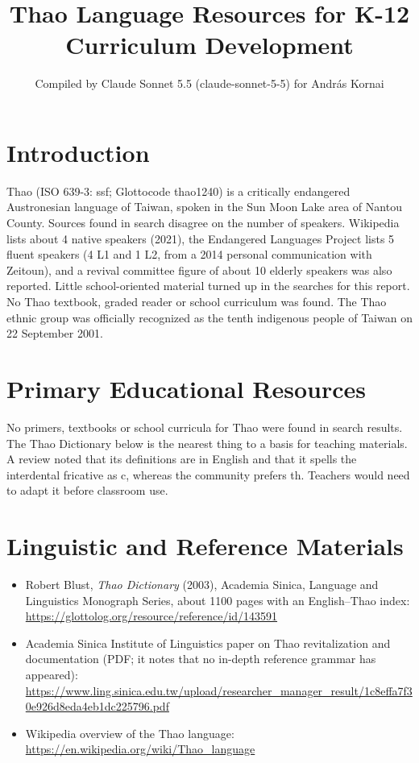 \documentclass[12pt]{article}
\title{Thao Language Resources for K-12 Curriculum Development}
\author{Compiled by Claude Sonnet 5.5 (claude-sonnet-5-5) for Andr\'as Kornai}
\date{}
\begin{document}
\maketitle

\section{Introduction}
Thao (ISO 639-3: ssf; Glottocode thao1240) is a critically endangered Austronesian language of Taiwan, spoken in the Sun Moon Lake area of Nantou County. Sources found in search disagree on the number of speakers. Wikipedia lists about 4 native speakers (2021), the Endangered Languages Project lists 5 fluent speakers (4 L1 and 1 L2, from a 2014 personal communication with Zeitoun), and a revival committee figure of about 10 elderly speakers was also reported. Little school-oriented material turned up in the searches for this report. No Thao textbook, graded reader or school curriculum was found. The Thao ethnic group was officially recognized as the tenth indigenous people of Taiwan on 22 September 2001.

\section{Primary Educational Resources}
No primers, textbooks or school curricula for Thao were found in search results. The Thao Dictionary below is the nearest thing to a basis for teaching materials. A review noted that its definitions are in English and that it spells the interdental fricative as c, whereas the community prefers th. Teachers would need to adapt it before classroom use.

\section{Linguistic and Reference Materials}
\begin{itemize}
\item Robert Blust, \emph{Thao Dictionary} (2003), Academia Sinica, Language and Linguistics Monograph Series, about 1100 pages with an English--Thao index: \url{https://glottolog.org/resource/reference/id/143591}
\item Academia Sinica Institute of Linguistics paper on Thao revitalization and documentation (PDF; it notes that no in-depth reference grammar has appeared): \url{https://www.ling.sinica.edu.tw/upload/researcher_manager_result/1c8effa7f30e926d8eda4eb1dc225796.pdf}
\item Wikipedia overview of the Thao language: \url{https://en.wikipedia.org/wiki/Thao_language}
\end{itemize}
\end{document}
